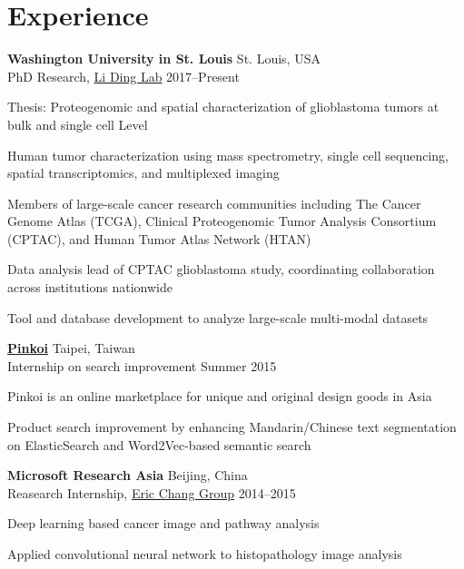 \section{Experience}

\begin{outerlist}

	\item \textbf{Washington University in St. Louis} \hfill St. Louis, USA\\
	PhD Research, \href{https://dinglab.wustl.edu/}{Li Ding Lab} \hfill
	2017--Present
	\begin{innerlist}
		\item Thesis: Proteogenomic and spatial characterization of glioblastoma tumors at bulk and single cell Level
		\item Human tumor characterization using mass spectrometry, single cell sequencing, spatial transcriptomics, and multiplexed imaging
		\detail
		\item Members of large-scale cancer research communities including The Cancer Genome Atlas (TCGA), Clinical Proteogenomic Tumor Analysis Consortium (CPTAC), and Human Tumor Atlas Network (HTAN)
		\item Data analysis lead of CPTAC glioblastoma study, coordinating collaboration across institutions nationwide
		\item Tool and database development to analyze large-scale multi-modal datasets
	\end{innerlist}

	\item \href{http://pinkoi.com}{\textbf{Pinkoi}} \hfill Taipei, Taiwan\\
	Internship on search improvement \hfill
	Summer 2015
	\begin{innerlist}
		\detail
		\item Pinkoi is an online marketplace for unique and original design goods in Asia
		\item Product search improvement by enhancing Mandarin/Chinese text segmentation on ElasticSearch and Word2Vec-based semantic search
	\end{innerlist}

	\item \textbf{Microsoft Research Asia} \hfill Beijing, China\\
	Reasearch Internship, \href{https://www.microsoft.com/en-us/research/people/echang/}{Eric Chang Group} \hfill
	2014--2015
	\begin{innerlist}
		\item Deep learning based cancer image and pathway analysis
		\detail \item Applied convolutional neural network to histopathology image analysis
	\end{innerlist}


\end{outerlist}
